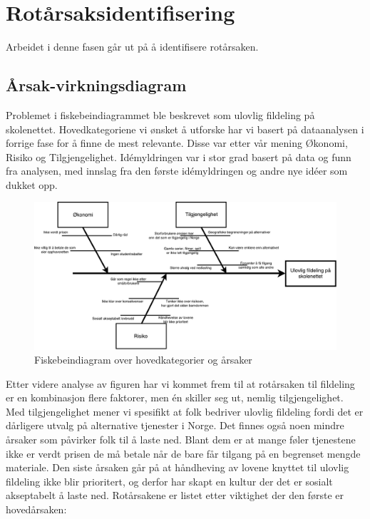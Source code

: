 \section{Rotårsaksidentifisering}
Arbeidet i denne fasen går ut på å identifisere rotårsaken.

\subsection{Årsak-virkningsdiagram}
Problemet i fiskebeindiagrammet ble beskrevet som ulovlig fildeling på skolenettet. Hovedkategoriene vi ønsket å utforske har vi basert på dataanalysen i forrige fase for å finne de mest relevante. Disse var etter vår mening Økonomi, Risiko og Tilgjengelighet. Idémyldringen var i stor grad basert på data og funn fra analysen, med innslag fra den første idémyldringen og andre nye idéer som dukket opp.

\begin{figure}[H]
    \centering
    \includegraphics[scale=0.5]{case_1/bilder/fiskebein.pdf}
    \caption[Fiskebeindiagram over hovedkategorier og årsaker]{Fiskebeindiagram over hovedkategorier og årsaker}
    \label{fig:case1-fiskebein}
\end{figure}

Etter videre analyse av figuren har vi kommet frem til at rotårsaken til fildeling er en kombinasjon flere faktorer, men én skiller seg ut, nemlig tilgjengelighet. Med tilgjengelighet mener vi spesifikt at folk bedriver ulovlig fildeling fordi det er dårligere utvalg på alternative tjenester i Norge. Det finnes også noen mindre årsaker som påvirker folk til å laste ned. Blant dem er at mange føler tjenestene ikke er verdt prisen de må betale når de bare får tilgang på en begrenset mengde materiale. Den siste årsaken går på at håndheving av lovene knyttet til ulovlig fildeling ikke blir prioritert, og derfor har skapt en kultur der det er sosialt akseptabelt å laste ned. Rotårsakene er listet etter viktighet der den første er hovedårsaken:

